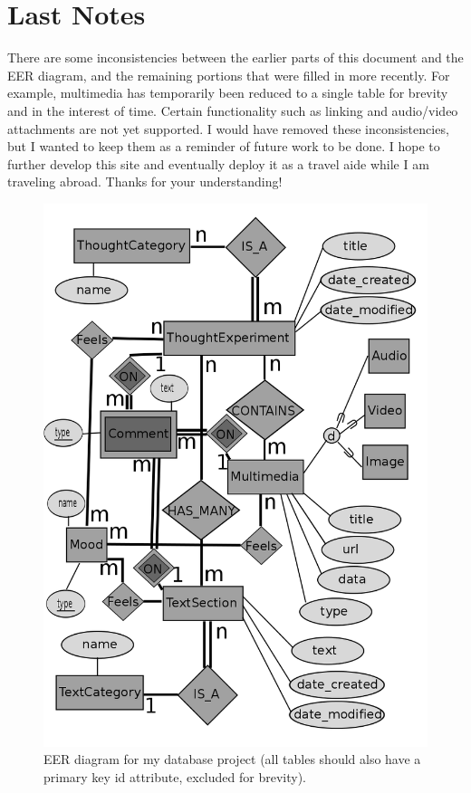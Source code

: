 \section{Last Notes}
There are some inconsistencies between the earlier parts of this document
and the EER diagram, and the remaining portions that were filled in more recently.
For example, multimedia has temporarily been reduced to a single table for brevity
and in the interest of time.
Certain functionality such as linking and audio/video attachments are not yet supported.
I would have removed these inconsistencies, but I wanted to keep them as a reminder of future work to be done.
I hope to further develop this site and eventually deploy it as a travel
aide while I am traveling abroad.  Thanks for your understanding!

\begin{figure}
\includegraphics[width=.8\linewidth]{eer}
\caption{EER diagram for my database project (all tables should also have a primary key id attribute, excluded for brevity).}
\label{eer}
\end{figure}

